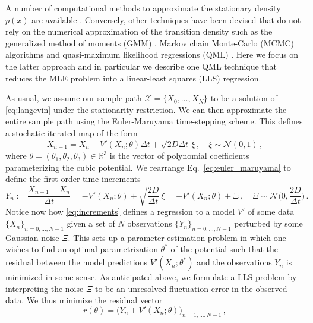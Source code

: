 \documentclass[a4paper,fleqn]{cas-sc}
\begin{document}
A number of computational methods to approximate the stationary density $p(x)$ are available \cite{Pedersen1995, Jensen2002, Sahalia2002}.
Conversely, other techniques have been devised that do not rely on the numerical approximation of the transition density such as the generalized method of moments (GMM) \cite{Hansen1982}, Markov chain Monte-Carlo (MCMC) algorithms \cite{Roberts2001,Alexander2005} and quasi-maximum likelihood regressions (QML) \cite{Castelle1986, Yoshida1992}.
Here we focus on the latter approach and in particular we describe one QML technique that reduces the MLE problem into a linear-least squares (LLS) regression.

As usual, we assume our sample path $\mathcal{X} = \{X_{0},\dots,X_{N}\}$ to be a solution of \eqref{eq:langevin} under the stationarity restriction.
We can then approximate the entire sample path using the Euler-Maruyama time-stepping scheme.
This defines a stochatic iterated map of the form
%
\begin{equation}\label{eq:euler_maruyama}
        X_{n+1} = X_{n} -V'(X_{n};\theta)\Delta t + \sqrt{2D\Delta t}\,\xi\,,\quad \xi\sim\mathcal{N}(0,1)\,,
\end{equation}
%
where $\theta=(\theta_1,\theta_2,\theta_3)\in\mathbb{R}^{3}$ is the vector of polynomial coefficients parameterizing the cubic potential.
We rearrange Eq.~\eqref{eq:euler_maruyama} to define the first-order time increments
%
\begin{equation}\label{eq:increments}
        Y_{n} := \frac{X_{n+1} - X_{n}}{\Delta t} = -V'(X_{n};\theta) + \sqrt{\frac{2D}{\Delta t}}\,\xi = -V'(X_{n};\theta) + \Xi\,,\quad\Xi\sim\mathcal{N}\bigg(0,\frac{2D}{\Delta t}\bigg)\,.
\end{equation}
%
Notice now how \eqref{eq:increments} defines a regression to a model $V'$ of some data $\{X_{n}\}_{n=0,\dots,N-1}$ given a set of $N$ observations $\{Y_{n}\}_{n=0,\dots,N-1}$ perturbed by some Gaussian noise $\Xi$.
This sets up a parameter estimation problem in which one wishes to find an optimal parametrization $\theta^*$ of the potential such that the residual between the model predictions $V'(X_{n};\theta^*)$ and the observations $Y_{n}$ is minimized in some sense.
As anticipated above, we formulate a LLS problem by interpreting the noise $\Xi$ to be an unresolved fluctuation error in the observed data.
We thus minimize the residual vector
\begin{equation}\label{eq:residual}
        r(\theta) = \big(Y_{n} + V'(X_{n};\theta)\big)_{n=1,\dots,N-1}\,,
\end{equation}
\end{document}
